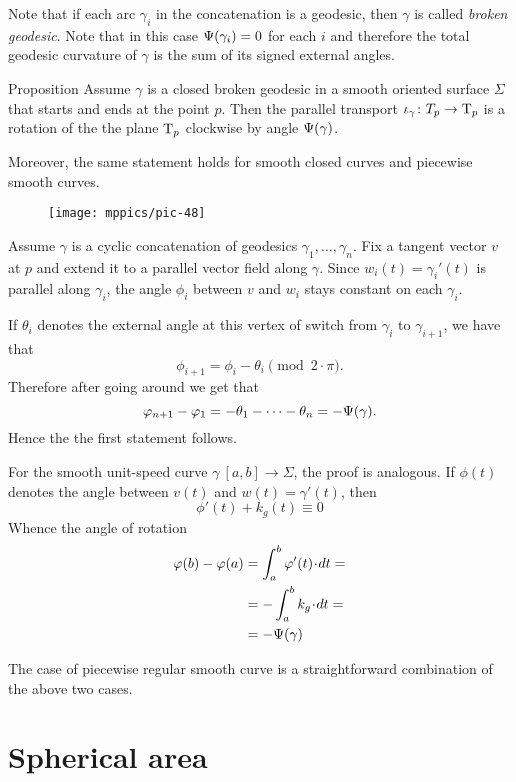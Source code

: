 Note that if each arc $\gamma_i$ in the concatenation is a geodesic, then $\gamma$ is called \emph{broken geodesic}.
Note that in this case $\Psi({\gamma_i})=0$ for each $i$ and therefore the total geodesic curvature of $\gamma$ is the sum of its signed external angles.

\begin{thm}{Proposition}\label{prop:pt+tgc}
Assume $\gamma$ is a closed broken geodesic in a smooth oriented surface $\Sigma$ that starts and ends at the point $p$.
Then the parallel transport $\iota_\gamma\colon T_p\to\mathrm{T}_p$ is a rotation of the the plane $\mathrm{T}_p$ clockwise by angle $\Psi({\gamma})$.

Moreover, the same statement holds for smooth closed curves and piecewise smooth curves.
\end{thm}

\begin{wrapfigure}{o}{22 mm}
\vskip-0mm
\centering
\texttt{[image: mppics/pic-48]}
\vskip-0mm
\end{wrapfigure}

Assume $\gamma$ is a cyclic concatenation of geodesics $\gamma_1,\dots,\gamma_n$.
Fix a tangent vector $v$ at $p$ and extend it to a parallel vector field along $\gamma$.
Since $w_i(t)=\gamma_i'(t)$ is parallel along $\gamma_i$, the angle $\phi_i$ between $v$ and $w_i$ stays constant on each $\gamma_i$.

If $\theta_i$ denotes the external angle at this vertex of switch from $\gamma_{i}$ to $\gamma_{i+1}$, we have that 
\[\phi_{i+1}=\phi_i-\theta_i \pmod{2\cdot\pi}.\]
Therefore after going around we get that 
\[\varphi_{n+1}-\varphi_1=-\theta_1-\dots-\theta_n=-\Psi({\gamma}).\]
Hence the the first statement follows.

For the smooth unit-speed curve $\gamma\:[a,b]\to\Sigma$, the proof is analogous.
If $\phi(t)$ denotes the angle between $v(t)$ and $w(t)=\gamma'(t)$, then 
\[\phi'(t)+k_g(t)\equiv0\]
Whence the angle of rotation 
\begin{align*}
\phi(b)-\phi(a)&=\int_a^b \phi'(t)\cdot dt=
\\
&=-\int_a^b k_g\cdot dt=
\\
&=-\tgc\gamma
\end{align*}

The case of piecewise regular smooth curve is a straightforward combination of the above two cases. 
\qeds


\section*{Spherical area}

